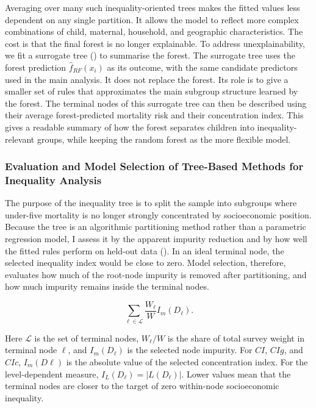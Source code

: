 \documentclass[
  11pt,
  a4paper,
]{article}
\begin{document}
Averaging over many such inequality-oriented trees makes the fitted
values less dependent on any single partition. It allows the model to
reflect more complex combinations of child, maternal, household, and
geographic characteristics. The cost is that the final forest is no
longer explainable. To address unexplainability, we fit a surrogate tree
() to summarise the forest. The surrogate tree uses the
forest prediction \(\hat{f}_{RF}(x_i)\) as its outcome, with the same
candidate predictors used in the main analysis. It does not replace the
forest. Its role is to give a smaller set of rules that approximates the
main subgroup structure learned by the forest. The terminal nodes of
this surrogate tree can then be described using their average
forest-predicted mortality risk and their concentration index. This
gives a readable summary of how the forest separates children into
inequality-relevant groups, while keeping the random forest as the more
flexible model.

\subsubsection{Evaluation and Model Selection of Tree-Based Methods for
Inequality Analysis}\label{sec-model-selection}

The purpose of the inequality tree is to split the sample into subgroups
where under-five mortality is no longer strongly concentrated by
socioeconomic position. Because the tree is an algorithmic partitioning
method rather than a parametric regression model, I assess it by the
apparent impurity reduction and by how well the fitted rules perform on
held-out data ().
In an ideal terminal node, the selected inequality index would be close
to zero. Model selection, therefore, evaluates how much of the root-node
impurity is removed after partitioning, and how much impurity remains
inside the terminal nodes.

\[
\sum_{\ell \in \mathcal{L}}
\frac{W_\ell}{W} I_m(D_\ell).
\]

Here \(\mathcal{L}\) is the set of terminal nodes, \(W_\ell/W\) is the
share of total survey weight in terminal node \(\ell\), and
\(I_m(D_\ell)\) is the selected node impurity. For \(CI\), \(CIg\), and
\(CIc\), \(I_m(D \ell)\) is the absolute value of the selected
concentration index. For the level-dependent measure,
\(I_L(D_\ell)=|L(D_\ell)|\). Lower values mean that the terminal nodes
are closer to the target of zero within-node socioeconomic inequality.
\end{document}
